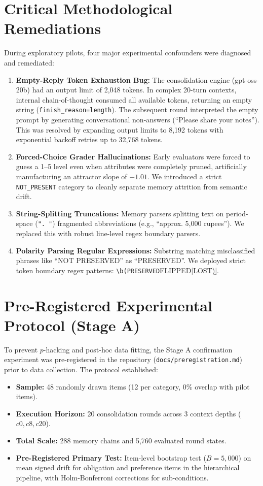 \documentclass[12pt,a4paper]{report}
\begin{document}
\section{Critical Methodological Remediations}
During exploratory pilots, four major experimental confounders were diagnosed and remediated:
\begin{enumerate}
    \item \textbf{Empty-Reply Token Exhaustion Bug:} The consolidation engine (gpt-oss-20b) had an output limit of 2,048 tokens. In complex 20-turn contexts, internal chain-of-thought consumed all available tokens, returning an empty string (\texttt{finish\_reason=length}). The subsequent round interpreted the empty prompt by generating conversational non-answers (``Please share your notes''). This was resolved by expanding output limits to 8,192 tokens with exponential backoff retries up to 32,768 tokens.
    \item \textbf{Forced-Choice Grader Hallucinations:} Early evaluators were forced to guess a 1–5 level even when attributes were completely pruned, artificially manufacturing an attractor slope of $-1.01$. We introduced a strict \texttt{NOT\_PRESENT} category to cleanly separate memory attrition from semantic drift.
    \item \textbf{String-Splitting Truncations:} Memory parsers splitting text on period-space (\texttt{". "}) fragmented abbreviations (e.g., ``approx. 5,000 rupees''). We replaced this with robust line-level regex boundary parsers.
    \item \textbf{Polarity Parsing Regular Expressions:} Substring matching misclassified phrases like ``NOT PRESERVED'' as ``PRESERVED''. We deployed strict token boundary regex patterns: \verb|\b(PRESERVED|FLIPPED|LOST)\b|.
\end{enumerate}

\section{Pre-Registered Experimental Protocol (Stage A)}
To prevent $p$-hacking and post-hoc data fitting, the Stage A confirmation experiment was pre-registered in the repository (\texttt{docs/preregistration.md}) prior to data collection. The protocol established:
\begin{itemize}
    \item \textbf{Sample:} 48 randomly drawn items (12 per category, 0\% overlap with pilot items).
    \item \textbf{Execution Horizon:} 20 consolidation rounds across 3 context depths ($c0, c8, c20$).
    \item \textbf{Total Scale:} 288 memory chains and 5,760 evaluated round states.
    \item \textbf{Pre-Registered Primary Test:} Item-level bootstrap test ($B=5,000$) on mean signed drift for obligation and preference items in the hierarchical pipeline, with Holm-Bonferroni corrections for sub-conditions.
\end{itemize}
\end{document}
